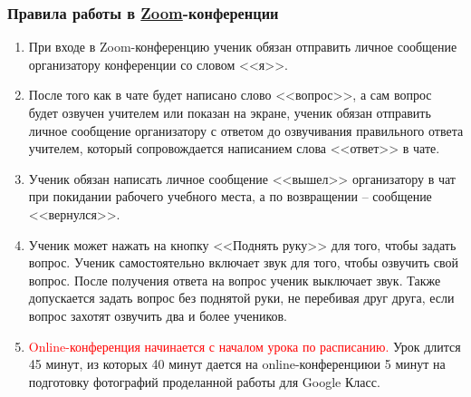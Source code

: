 \documentclass[geometry,a5paper]{pum}
\date{11.04.20}
\begin{document}


\subsubsection*{Правила работы в \href{https://zoom.us}{Zoom}-конференции}
\begin{enumerate}[nosep]
  \item При входе в Zoom-конференцию ученик обязан отправить личное сообщение организатору конференции со словом <<я>>.
  \item После того как в чате будет написано слово <<вопрос>>, а сам вопрос будет озвучен учителем или показан на экране, ученик обязан отправить личное сообщение организатору с ответом до озвучивания правильного ответа учителем, который сопровождается написанием слова <<ответ>> в чате.
  \item Ученик обязан написать личное сообщение <<вышел>> организатору в чат при покидании рабочего учебного места, а по возвращении -- сообщение <<вернулся>>.
  \item Ученик может нажать на кнопку <<Поднять руку>> для того, чтобы задать вопрос. Ученик самостоятельно включает звук для того, чтобы озвучить свой вопрос. После получения ответа на вопрос ученик выключает звук. Также допускается задать вопрос без поднятой руки, не перебивая друг друга, если вопрос захотят озвучить два и более учеников.
  \item \textcolor{red}{Online-конференция начинается с началом урока по расписанию.} Урок длится 45 минут, из которых 40 минут дается на online-конференциюи 5 минут на подготовку фотографий проделанной работы для Google Класс. 
\end{enumerate}

\vspace{-0.3cm}
\end{document}
